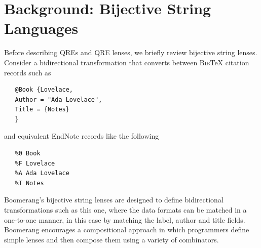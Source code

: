 \documentclass[acmsmall,review,anonymous]{acmart}
\newcommand{\bibtex}{\textsc{Bib}\TeX{}}
\begin{document}
\section{Background: Bijective String Languages}
\label{sec:background}
Before describing QREs and QRE lenses, we briefly review bijective
string lenses. Consider a bidirectional transformation that converts
between \bibtex{} citation records such as
\begin{verbatim}
   @Book {Lovelace,
   Author = "Ada Lovelace",
   Title = {Notes}
   }
\end{verbatim}
\noindent
and equivalent EndNote records like the following
\begin{verbatim}
   %0 Book
   %F Lovelace
   %A Ada Lovelace
   %T Notes
\end{verbatim}
\noindent
Boomerang's bijective string lenses are designed to define bidirectional
transformations such as this one, where the data formats can be matched in a
one-to-one manner, in this case by matching the label, author and title fields.
Boomerang encourages a compositional approach in which programmers
define simple lenses and then compose them using a variety of
combinators. 
\end{document}
